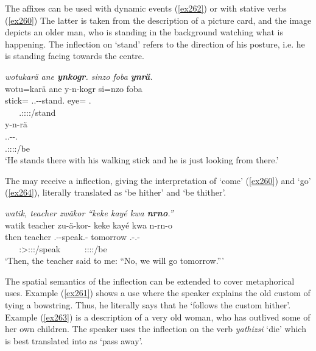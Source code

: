 The  affixes can be used with dynamic events (\ref{ex262}) or with stative verbs (\ref{ex260}) The latter is taken from the description of a picture card, and the image depicts an older man, who is standing in the background watching what is happening. The  inflection on `stand' refers to the direction of his posture, i.e. he is standing facing towards the  centre.

\begin{exe}
	\ex \emph{wotukarä ane \textbf{ynkogr}. sinzo foba \textbf{ynrä}.}\\
	\glll wotu=karä ane y-n-kogr si=nzo foba\\
	stick={\Prop} {\Dem} \Tsg.\Masc.\Alph-\Venit-stand.{\Ndu} eye={\Only} \Dist.{\Abl}\\
	~ ~ {\footnotesize \Tsg.\Masc:\Sbj:\Nonpast:\Ipfv:\Venit/stand} ~ ~\\
	\sn
	\glll y-n-rä\\
	\Tsg.\Masc.\Alph-\Venit-\Cop.\Ndu\\
	{\footnotesize \Tsg.\Masc:\Sbj:\Nonpast:\Ipfv:\Venit/be}\\
	\trans `He stands there with his walking stick and he is just looking from there.'\\ 
	\label{ex260}
\end{exe}

The  may receive a  inflection, giving the interpretation of `come' (\ref{ex260}) and `go' (\ref{ex264}), literally translated as `be hither' and `be thither'.

\begin{exe}
	\ex \emph{watik, teacher zwäkor ``keke kayé kwa \textbf{nrno}.''}\\
	\glll watik teacher zu-ä-kor-\Zero{} keke kayé kwa n-rn-o\\
	then teacher \Fsg.\Gam-\Ndu-speak.\Rs-\Stsg{} {\Neg} tomorrow {\Fut} \Fnsg.\Alph-\Cop.\Du-\Andat{}\\
	~ ~ {\footnotesize \Stsg:\Sbj>\Fsg:\Obj:\Rpst:\Pfv/speak} ~ ~ ~ {\footnotesize \Fdu:\Sbj:\Nonpast:\Ipfv:\Andat/be}\\
	\trans `Then, the teacher said to me: ``No, we will go tomorrow.'''\\ 
	\label{ex264}
\end{exe}

The spatial semantics of the  inflection can be extended to cover metaphorical uses. Example (\ref{ex261}) shows a  use where the speaker explains the old custom of tying a bowstring. Thus, he literally says that he `follows the custom hither'. Example (\ref{ex263}) is a description of a very old woman, who has outlived some of her own children. The speaker uses the  inflection on the verb \emph{yathizsi} `die' which is best translated into  as `pass away'.

